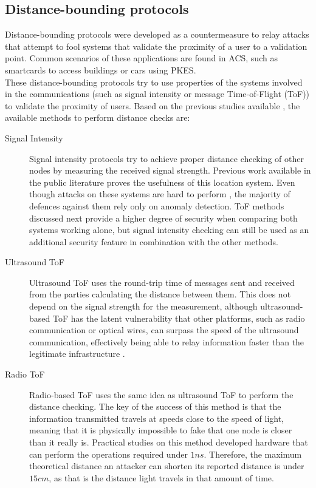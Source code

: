 \documentclass{article}
\begin{document}
\subsection{Distance-bounding protocols}

Distance-bounding protocols were developed as a countermeasure to relay attacks that attempt to fool systems that validate the proximity of a user to a validation point. Common scenarios of these applications are found in ACS, such as smartcards to access buildings or cars using PKES.\\

These distance-bounding protocols try to use properties of the systems involved in the communications (such as signal intensity or message Time-of-Flight (ToF)) to validate the proximity of users. Based on the previous studies available \cite{capkun2006secure}, the available methods to perform distance checks are:\\

\begin{description}
  \item[Signal Intensity] Signal intensity protocols try to achieve proper distance checking of other nodes by measuring the received signal strength. Previous work available in the public literature \cite{seshadri2005bayesian} proves the usefulness of this location system. Even though attacks on these systems are hard to perform \cite{sheng2008detecting}, the majority of defences against them rely only on anomaly detection. ToF methods discussed next provide a higher degree of security when comparing both systems working alone, but signal intensity checking can still be used as an additional security feature in combination with the other methods.\\
  
  \item[Ultrasound ToF] Ultrasound ToF uses the round-trip time of messages sent and received from the parties calculating the distance between them. This does not depend on the signal strength for the measurement, although ultrasound-based ToF has the latent vulnerability that other platforms, such as radio communication or optical wires, can surpass the speed of the ultrasound communication, effectively being able to relay information faster than the legitimate infrastructure \cite{capkun2006secure}.\\
  
  \item[Radio ToF] Radio-based ToF uses the same idea as ultrasound ToF to perform the distance checking. The key of the success of this method is that the information transmitted travels at speeds close to the speed of light, meaning that it is physically impossible to fake that one node is closer than it really is. Practical studies on this method \cite{rasmussen2010realization} developed hardware that can perform the operations required under $1ns$. Therefore, the maximum theoretical distance an attacker can shorten its reported distance is under $15cm$, as that is the distance light travels in that amount of time.\\\
\end{description}
\end{document}

